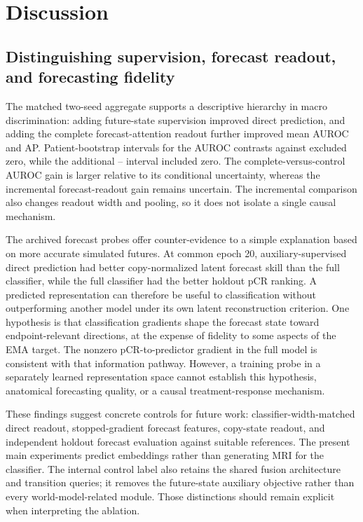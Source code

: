 \section{Discussion}
\label{sec:discussion}
\subsection{Distinguishing supervision, forecast readout, and forecasting fidelity}
The matched two-seed aggregate supports a descriptive hierarchy in macro discrimination: adding future-state supervision improved direct prediction, and adding the complete forecast-attention readout further improved mean AUROC and AP. Patient-bootstrap intervals for the AUROC contrasts against \nojepa{} excluded zero, while the additional \fullmodel{}--\direct{} interval included zero. The complete-versus-control AUROC gain is larger relative to its conditional uncertainty, whereas the incremental forecast-readout gain remains uncertain. The incremental comparison also changes readout width and pooling, so it does not isolate a single causal mechanism.

The archived forecast probes offer counter-evidence to a simple explanation based on more accurate simulated futures. At common epoch 20, auxiliary-supervised direct prediction had better copy-normalized latent forecast skill than the full classifier, while the full classifier had the better holdout pCR ranking. A predicted representation can therefore be useful to classification without outperforming another model under its own latent reconstruction criterion. One hypothesis is that classification gradients shape the forecast state toward endpoint-relevant directions, at the expense of fidelity to some aspects of the EMA target. The nonzero pCR-to-predictor gradient in the full model is consistent with that information pathway. However, a training probe in a separately learned representation space cannot establish this hypothesis, anatomical forecasting quality, or a causal treatment-response mechanism.

These findings suggest concrete controls for future work: classifier-width-matched direct readout, stopped-gradient forecast features, copy-state readout, and independent holdout forecast evaluation against suitable references. The present main experiments predict embeddings rather than generating MRI for the classifier. The internal control label \nojepa{} also retains the shared fusion architecture and transition queries; it removes the future-state auxiliary objective rather than every world-model-related module. Those distinctions should remain explicit when interpreting the ablation.

